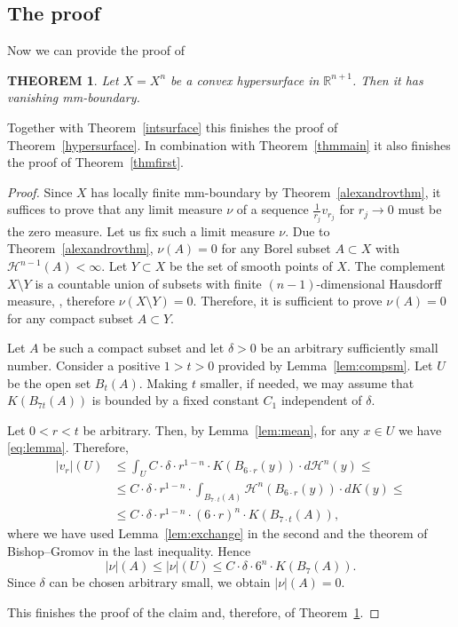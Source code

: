 \documentclass[12pt,leqno,intlimits]{amsart}
\numberwithin{equation}{section}
\newtheorem{thm}{THEOREM}[section]
\theoremstyle{definition}
\theoremstyle{remark}
\newcommand{\tref}[1]{Theorem~\ref{#1}}
\newcommand{\lref}[1]{Lemma~\ref{#1}}
\newcommand{\R}{\mathbb{R}}
\begin{document}
\subsection{The proof} Now we can provide the proof of
\begin{thm} \label{thmconv}
Let $X=X^n$ be a convex hypersurface in $\R^{n+1}$.
Then it has vanishing  mm-boundary.

\end{thm}
Together with \tref{intsurface} this finishes the proof of \tref{hypersurface}. In combination with \tref{thmmain} it also finishes the proof of \tref{thmfirst}.
\begin{proof}
Since $X$ has locally finite mm-boundary by
\tref{alexandrovthm}, it suffices to prove that any limit measure $\nu$ of a sequence $\frac 1 {r_j} v_{r_j}$ for $r_j\to 0$ must be the zero measure.
Let us fix such a limit measure $\nu$. Due to \tref{alexandrovthm}, $\nu (A)=0$ for any Borel subset $A\subset X$ with $\mathcal H^{n-1} (A)<\infty$.
Let $Y\subset X$ be the set of smooth points of $X$.
The complement $X\setminus Y$ is a countable union of subsets with finite $(n-1)$-dimensional Hausdorff measure, \cite[Theorem 1.4]{Schneider}, therefore $\nu (X\setminus Y) =0$. Therefore, it is sufficient to prove $\nu (A)=0$
for any compact subset $A\subset Y$.

Let $A$ be such a compact subset and let $\delta>0$ be an arbitrary sufficiently small number. Consider a positive $1>t>0$ provided by \lref{lem:compsm}. Let $U$ be the open set $B_t (A)$. Making $t$ smaller, if needed, we may assume that $K(B_{7t}(A))$ is bounded by a
fixed constant $C_1$ independent of $\delta$.

Let $0<r<t$ be arbitrary. Then, by \lref{lem:mean}, for any $x\in U$ we have \eqref{eq:lemma}.
Therefore, 
\begin{align*}
|v_r| (U)
&\leq \int _U C\cdot \delta \cdot r^{1-n}\cdot K (B_{6{\cdot}r} (y)) \cdot d\mathcal H^n (y) \leq
\\
&\leq C\cdot \delta \cdot r^{1-n} \cdot \int _{B_{7{\cdot}t} (A)} \mathcal H^n (B_{6{\cdot}r} (y)) \cdot dK(y) 
\leq 
\\
&\leq C\cdot \delta \cdot r^{1-n} \cdot (6{\cdot}r) ^n \cdot K(B_{7{\cdot}t} (A)),
\end{align*}
where we have used \lref{lem:exchange} in the second and the theorem of Bishop--Gromov in the last inequality. Hence
$$|\nu| (A) \leq |\nu| (U) \leq C\cdot \delta \cdot 6^n \cdot K(B_7 (A)). $$
Since $\delta$ can be chosen arbitrary small, we obtain $|\nu| (A)=0$.

This finishes the proof of the claim and, therefore, of \tref{thmconv}.
\end{proof}
\end{document}
